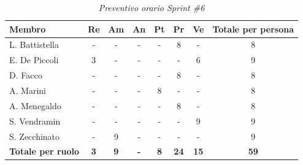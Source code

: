﻿\documentclass[a4paper, 10pt, colorlinks=true, linkcolor=black, urlcolor=blue, citecolor=blue, hidelinks]{article}
\renewcommand{\arraystretch}{1.2}
\begin{document}
\begin{table}[H]
    \centering
    \renewcommand{\arraystretch}{1.4}
    \begin{tabular}{|l|c|c|c|c|c|c|c|}
        \hline
        \rowcolor{bluBitless!15}
        \textbf{Membro} & \textbf{Re} & \textbf{Am} & \textbf{An} & \textbf{Pt} & \textbf{Pr} & \textbf{Ve} & \textbf{Totale per persona} \\
        \hline
        L. Battistella & - & - & - & - & 8 & - & 8 \\ \hline
        E. De Piccoli & 3 & - & - & - & - & 6 & 9 \\ \hline
        D. Facco & - & - & - & - & 8 & - & 8 \\ \hline
        A. Marini & - & - & - & 8 & - & - & 8 \\ \hline
        A. Menegaldo & - & - & - & - & 8 & - & 8 \\ \hline
        S. Vendramin & - & - & - & - & - & 9 & 9 \\ \hline
        S. Zecchinato & - & 9 & - & - & - & - & 9 \\ \hline
        \rowcolor{bluBitless!8}
        \textbf{Totale per ruolo} & \textbf{3} & \textbf{9} & \textbf{-} & \textbf{8} & \textbf{24} & \textbf{15} & \textbf{59} \\
        \hline
    \end{tabular}
    \caption{\textit{Preventivo orario Sprint \#6}}
\end{table}
\end{document}
